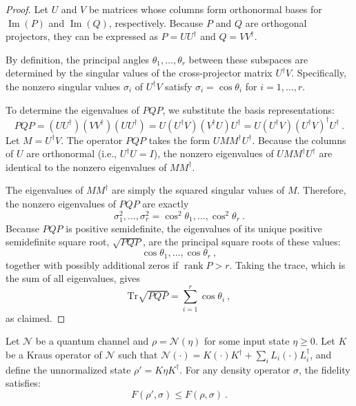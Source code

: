 \documentclass[a4paper,onecolumn,11pt]{quantumarticle}
\providecommand{\customgenericname}{}
\newenvironment{mlemma}[1]{%
  \renewcommand\customgenericname{Lemma}%
  \renewcommand\theinnercustomgeneric{#1}%
  \innercustomgeneric
}{\endinnercustomgeneric}
\newcommand*{\Tr}{\mathrm{Tr}}
\begin{document}
\begin{proof}
Let $U$ and $V$ be matrices whose columns form orthonormal bases for $\operatorname{Im}(P)$ and $\operatorname{Im}(Q)$, respectively. Because $P$ and $Q$ are orthogonal projectors, they can be expressed as $P = UU^\dagger$ and $Q = VV^\dagger$.

By definition, the principal angles $\theta_1, \dots, \theta_r$ between these subspaces are determined by the singular values of the cross-projector matrix $U^\dagger V$. Specifically, the nonzero singular values $\sigma_i$ of $U^\dagger V$ satisfy $\sigma_i = \cos\theta_i$ for $i = 1, \dots, r$.

To determine the eigenvalues of $PQP$, we substitute the basis representations:
\begin{equation}
    PQP = (UU^\dagger)(VV^\dagger)(UU^\dagger) = U(U^\dagger V)(V^\dagger U)U^\dagger = U(U^\dagger V)(U^\dagger V)^\dagger U^\dagger \ .
\end{equation}
Let $M = U^\dagger V$. The operator $PQP$ takes the form $UMM^\dagger U^\dagger$. Because the columns of $U$ are orthonormal (i.e., $U^\dagger U = I$), the nonzero eigenvalues of $UMM^\dagger U^\dagger$ are identical to the nonzero eigenvalues of $MM^\dagger$. 

The eigenvalues of $MM^\dagger$ are simply the squared singular values of $M$. Therefore, the nonzero eigenvalues of $PQP$ are exactly
\begin{equation}
    \sigma_1^2, \dots, \sigma_r^2 = \cos^2\theta_1, \dots, \cos^2\theta_r \ .
\end{equation}
Because $PQP$ is positive semidefinite, the eigenvalues of its unique positive semidefinite square root, $\sqrt{PQP}$, are the principal square roots of these values:
\begin{equation}
    \cos\theta_1, \dots, \cos\theta_r \ ,
\end{equation}
together with possibly additional zeros if $\operatorname{rank}P > r$. Taking the trace, which is the sum of all eigenvalues, gives
\begin{equation}
    \Tr \sqrt{PQP} = \sum_{i=1}^r \cos\theta_i \ ,
\end{equation}
as claimed.
\end{proof}


\begin{mlemma}{5}[Monotonicity]
Let $\mathcal{N}$ be a quantum channel and $\rho = \mathcal{N}(\eta)$ for some input state $\eta \geq 0$. Let $K$ be a Kraus operator of $\mathcal{N}$ such that $\mathcal{N}(\cdot) = K(\cdot)K^\dagger + \sum_{i} L_i (\cdot) L_i^\dagger$, and define the unnormalized state $\rho' = K \eta K^\dagger$. For any density operator $\sigma$, the fidelity satisfies:
\begin{equation}
    F(\rho', \sigma) \leq F(\rho, \sigma) \ .
\end{equation}
\end{mlemma}
\end{document}
